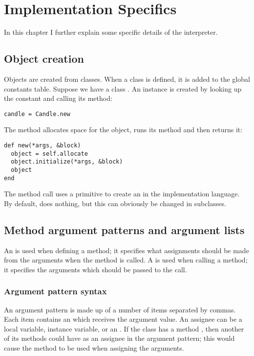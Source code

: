 \chapter{Implementation Specifics}
\label{sec:implementation_specifics}

In this chapter I further explain some specific details of the interpreter.

\section{Object creation}

Objects are created from classes. When a class is defined, it is added to the global constants table. Suppose we have a class . An instance is created by looking up the  constant and calling its  method:

\begin{lstlisting}
candle = Candle.new
\end{lstlisting}

The  method allocates space for the object, runs its  method and then returns it:

\begin{lstlisting}
def new(*args, &block)
  object = self.allocate
  object.initialize(*args, &block)
  object
end
\end{lstlisting}

The  method call uses a primitive to create an  in the implementation language. By default,  does nothing, but this can obviously be changed in subclasses.

\section{Method argument patterns and argument lists}
\label{sec:arguments}

An  is used when defining a method; it specifies what assignments should be made from the arguments when the method is called. A  is used when calling a method; it specifies the arguments which should be passed to the call.

\subsection{Argument pattern syntax}

An argument pattern is made up of a number of items separated by commas. Each item contains an  which receives the argument value. An assignee can be a local variable, instance variable, or an . If the class has a method , then another of its methods could have  as an assignee in the argument pattern; this would cause the  method to be used when assigning the arguments.

